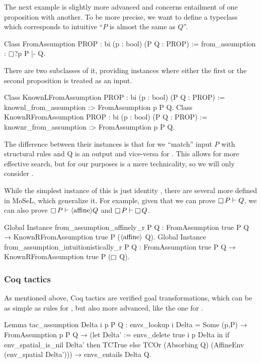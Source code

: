 The next example is slightly more advanced and concerns entailment of one proposition with another.
To be more precise, we want to define a typeclass which corresponds to intuitive ``\(P\) is almost the same as \(Q\)''.
\begin{coq}
Class FromAssumption {PROP : bi} (p : bool) (P Q : PROP) :=
  from_assumption : $\mathop{\Box}$?p P |- Q.
\end{coq}

There are two subclasses of it, providing instances where either the first or the second proposition is treated as an input.
\begin{coq}
Class KnownLFromAssumption {PROP : bi} (p : bool) (P Q : PROP) :=
  knownl_from_assumption :> FromAssumption p P Q.
Class KnownRFromAssumption {PROP : bi} (p : bool) (P Q : PROP) :=
  knownr_from_assumption :> FromAssumption p P Q.
\end{coq}

The difference between their instances is that for  we ``match'' input \(P\) with structural rules and Q is an output and vice-versa for .
This allows for more effective search, but for our purposes is a mere technicality, so we will only consider .

While the simplest instance of this is just identity , there are several more defined in MoSeL, which generalize it.
For example, given that we can prove \(\mathop{\Box} P \vdash Q\), we can also prove \(\mathop{\Box} P \vdash \langle\text{affine}\rangle Q\) and  \(\mathop{\Box} P \vdash \mathop{\Box} Q\).
\begin{coq}
Global Instance from_assumption_affinely_r P Q :
  FromAssumption true P Q → KnownRFromAssumption true P ($\langle\text{affine}\rangle$ Q).
Global Instance from_assumption_intuitionistically_r P Q :
  FromAssumption true P Q → KnownRFromAssumption true P ($\mathop{\Box}$ Q).
\end{coq}

\subsubsection{Coq tactics}
\label{sec:coq-tactics}

As mentioned above, Coq tactics are verified goal transformations, which can be as simple as rules for , but also more advanced, like the one for .

\begin{coq}
Lemma tac_assumption Delta i p P Q :
  envs_lookup i Delta = Some (p,P) →
  FromAssumption p P Q →
  (let Delta' := envs_delete true i p Delta in
   if env_spatial_is_nil Delta' then TCTrue
   else TCOr (Absorbing Q) (AffineEnv (env_spatial Delta'))) →
  envs_entails Delta Q.
\end{coq}

